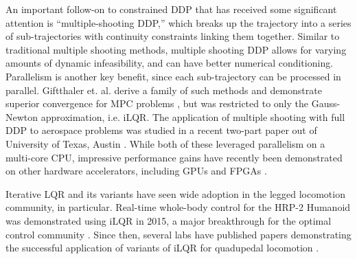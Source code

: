 \documentclass[../root.tex]{subfiles}
\begin{document}
An important follow-on to constrained DDP that has received some significant
attention is ``multiple-shooting DDP,'' which breaks up the trajectory into a
series of sub-trajectories with continuity constraints linking them together.
Similar to traditional multiple shooting methods, multiple shooting DDP
allows for varying amounts of dynamic infeasibility, and can have better
numerical conditioning. Parallelism is another key benefit, since each
sub-trajectory can be processed in parallel. Giftthaler et. al. derive a
family of such methods and demonstrate superior convergence for MPC problems
\cite{giftthaler_Family_2017}, but was restricted to only the Gauss-Newton
approximation, i.e. iLQR. The application of multiple shooting with full DDP
to aerospace problems was studied in a recent two-part paper out of
University of Texas, Austin
\cite{pellegrini_Multipleshooting_2020,pellegrini_Multipleshooting_2020a}.
While both of these leveraged parallelism on a multi-core CPU, impressive
performance gains have recently been demonstrated on other hardware
accelerators, including GPUs and FPGAs \cite{plancher_Performance_2020}.

Iterative LQR and its variants have seen wide adoption in the legged
locomotion community, in particular. Real-time whole-body control for the
HRP-2 Humanoid was demonstrated using iLQR in 2015, a major breakthrough for
the optimal control community \cite{koenemann_Wholebody_2015}. Since then,
several labs have published papers demonstrating the successful application
of variants of iLQR for quadupedal locomotion
\cite{farshidian_Efficient_2017,mastalli_Crocoddyl_2019,neunert_WholeBody_2018}.
\end{document}
